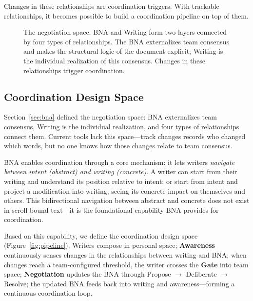 \noindent Changes in these relationships are coordination triggers. With trackable relationships, it becomes possible to build a coordination pipeline on top of them.

\begin{figure}[t]
\centering
{}
\caption{The negotiation space. BNA and Writing form two layers connected by four types of relationships. The BNA externalizes team consensus and makes the structural logic of the document explicit; Writing is the individual realization of this consensus. Changes in these relationships trigger coordination.}
\label{fig:negotiation-space}
\end{figure}


\subsection{Coordination Design Space}
\label{sec:design-space}

Section~\ref{sec:bna} defined the negotiation space: BNA externalizes team consensus, Writing is the individual realization, and four types of relationships connect them. Current tools lack this space---track changes records who changed which words, but no one knows how those changes relate to team consensus.

BNA enables coordination through a core mechanism: it lets writers \emph{navigate between intent (abstract) and writing (concrete)}. A writer can start from their writing and understand its position relative to intent; or start from intent and project a modification into writing, seeing its concrete impact on themselves and others. This bidirectional navigation between abstract and concrete does not exist in scroll-bound text---it is the foundational capability BNA provides for coordination.

Based on this capability, we define the coordination design space (Figure~\ref{fig:pipeline}). Writers compose in personal space; \textbf{Awareness} continuously senses changes in the relationships between writing and BNA; when changes reach a team-configured threshold, the writer crosses the \textbf{Gate} into team space; \textbf{Negotiation} updates the BNA through Propose $\rightarrow$ Deliberate $\rightarrow$ Resolve; the updated BNA feeds back into writing and awareness---forming a continuous coordination loop.

